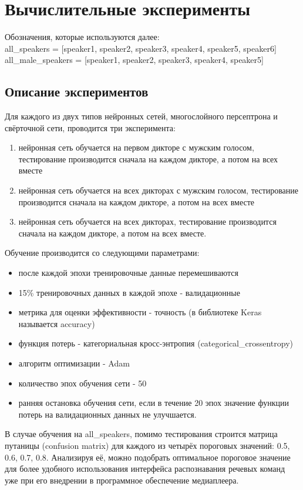 \section{Вычислительные эксперименты}
Обозначения, которые используются далее: \\
all\_speakers = [speaker1, speaker2, speaker3, speaker4, speaker5, speaker6] \\
all\_male\_speakers = [speaker1, speaker2, speaker3, speaker4, speaker5]
\subsection{Описание экспериментов}
Для каждого из двух типов нейронных сетей, многослойного персептрона и свёрточной сети, проводится три эксперимента:
\begin{enumerate}[leftmargin=2cm]
	\item нейронная сеть обучается на первом дикторе с мужским голосом, тестирование производится сначала на каждом дикторе, а потом на всех вместе
	\item нейронная сеть обучается на всех дикторах с мужским голосом, тестирование производится сначала на каждом дикторе, а потом на всех вместе
	\item нейронная сеть обучается на всех дикторах, тестирование производится сначала на каждом дикторе, а потом на всех вместе.
\end{enumerate}

Обучение производится со следующими параметрами:
\begin{itemize}[leftmargin=2cm]
	\item после каждой эпохи тренировочные данные перемешиваются
	\item 15\% тренировочных данных в каждой эпохе - валидационные
	\item метрика для оценки эффективности - точность (в библиотеке Keras называется accuracy)
	\item функция потерь - категориальная кросс-энтропия (categorical\_crossentropy)
	\item алгоритм оптимизации - Adam
	\item количество эпох обучения сети - 50
	\item ранняя остановка обучения сети, если в течение 20 эпох значение функции потерь на валидационных данных не улучшается.
\end{itemize}

В случае обучения на all\_speakers, помимо тестирования строится матрица путаницы (confusion matrix) для каждого из четырёх пороговых значений: 0.5, 0.6, 0.7, 0.8. Анализируя её, можно подобрать оптимальное пороговое значение для более удобного использования интерфейса распознавания речевых команд уже при его внедрении в программное обеспечение медиаплеера. 

